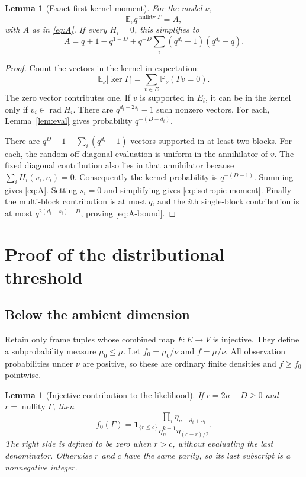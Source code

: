 \documentclass[11pt,letterpaper]{article}
\newtheorem{lemma}[theorem]{Lemma}
\theoremstyle{definition}
\theoremstyle{remark}
\newcommand{\E}{\mathbb E}
\newcommand{\Prob}{\mathbb P}
\newcommand{\rad}{\operatorname{rad}}
\newcommand{\nul}{\operatorname{nullity}}
\newcommand{\abs}[1]{\lvert #1\rvert}
\begin{document}
\begin{lemma}[Exact first kernel moment]\label{lem:moment}
For the model $\nu$,
\[
 \E_\nu q^{\nul\Gamma}=A,
\]
with $A$ as in \eqref{eq:A}. If every $H_i=0$, this simplifies to
\begin{equation}\label{eq:isotropic-moment}
 A=q+1-q^{1-D}+q^{-D}\sum_i(q^{d_i}-1)(q^{d_i}-q).
\end{equation}
\end{lemma}

\begin{proof}
Count the vectors in the kernel in expectation:
\[
 \E_\nu\abs{\ker\Gamma}=\sum_{v\in E}\Prob_\nu(\Gamma v=0).
\]
The zero vector contributes one. If $v$ is supported in $E_i$, it can be in the kernel only if $v_i\in\rad H_i$. There are $q^{d_i-2s_i}-1$ such nonzero vectors. For each, Lemma~\ref{lem:eval} gives probability $q^{-(D-d_i)}$.

There are $q^D-1-\sum_i(q^{d_i}-1)$ vectors supported in at least two blocks. For each, the random off-diagonal evaluation is uniform in the annihilator of $v$. The fixed diagonal contribution also lies in that annihilator because $\sum_iH_i(v_i,v_i)=0$. Consequently the kernel probability is $q^{-(D-1)}$. Summing gives \eqref{eq:A}. Setting $s_i=0$ and simplifying gives \eqref{eq:isotropic-moment}. Finally the multi-block contribution is at most $q$, and the $i$th single-block contribution is at most $q^{2(d_i-s_i)-D}$, proving \eqref{eq:A-bound}.
\end{proof}

\section{Proof of the distributional threshold}

\subsection{Below the ambient dimension}

Retain only frame tuples whose combined map $F:E\to V$ is injective. They define a subprobability measure $\mu_0\le\mu$. Let $f_0=\mu_0/\nu$ and $f=\mu/\nu$. All observation probabilities under $\nu$ are positive, so these are ordinary finite densities and $f\ge f_0$ pointwise.

\begin{lemma}[Injective contribution to the likelihood]\label{lem:injective}
If $c=2n-D\ge0$ and $r=\nul\Gamma$, then
\begin{equation}\label{eq:injective-density}
 f_0(\Gamma)=\mathbf 1_{\{r\le c\}}
 \frac{\prod_i\eta_{n-d_i+s_i}}
 {\eta_n^{k-1}\eta_{(c-r)/2}}.
\end{equation}
The right side is defined to be zero when $r>c$, without evaluating the last denominator. Otherwise $r$ and $c$ have the same parity, so its last subscript is a nonnegative integer.
\end{lemma}
\end{document}
